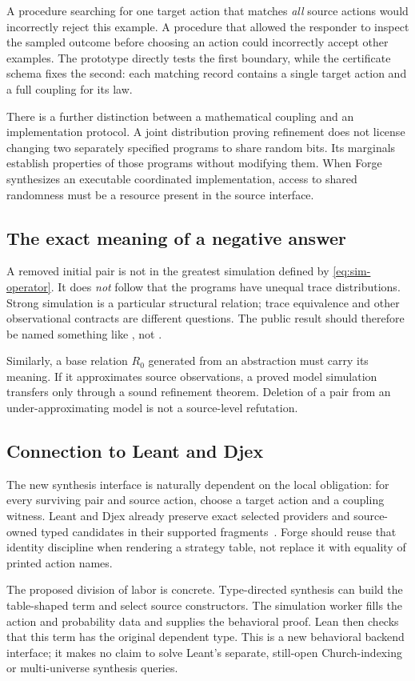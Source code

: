 A procedure searching for one target action that matches \emph{all} source
actions would incorrectly reject this example. A procedure that allowed the
responder to inspect the sampled outcome before choosing an action could
incorrectly accept other examples. The prototype directly tests the first
boundary, while the certificate schema fixes the second: each matching record
contains a single target action and a full coupling for its law.

There is a further distinction between a mathematical coupling and an
implementation protocol. A joint distribution proving refinement does not
license changing two separately specified programs to share random bits.
Its marginals establish properties of those programs without modifying them.
When Forge synthesizes an executable coordinated implementation, access to
shared randomness must be a resource present in the source interface.

\subsection{The exact meaning of a negative answer}

A removed initial pair is not in the greatest simulation defined by
\eqref{eq:sim-operator}. It does \emph{not} follow that the programs have unequal
trace distributions. Strong simulation is a particular structural relation;
trace equivalence and other observational contracts are different questions.
The public result should therefore be named something like
, not .

Similarly, a base relation $R_0$ generated from an abstraction must carry its
meaning. If it approximates source observations, a proved model simulation
transfers only through a sound refinement theorem. Deletion of a pair from an
under-approximating model is not a source-level refutation.

\subsection{Connection to Leant and Djex}

The new synthesis interface is naturally dependent on the local obligation:
for every surviving pair and source action, choose a target action and a
coupling witness. Leant and Djex already preserve exact selected providers and
source-owned typed candidates in their supported fragments~\cite{leant,djex}.
Forge should reuse that identity discipline when rendering a strategy table,
not replace it with equality of printed action names.

The proposed division of labor is concrete. Type-directed synthesis can build
the table-shaped term and select source constructors. The simulation worker
fills the action and probability data and supplies the behavioral proof. Lean
then checks that this term has the original dependent type. This is a new
behavioral backend interface; it makes no claim to solve Leant's separate,
still-open Church-indexing or multi-universe synthesis queries.
